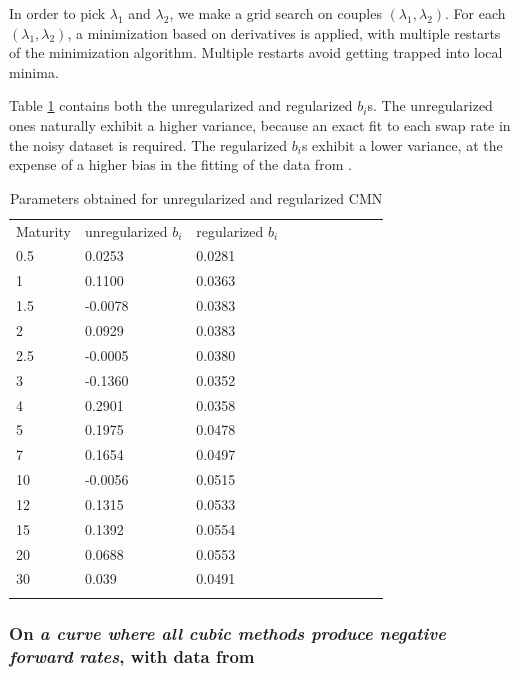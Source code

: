 In order to pick $\lambda_1$ and $\lambda_2$, we make a grid search on couples $(\lambda_1, \lambda_2)$. For each $(\lambda_1, \lambda_2)$, a minimization based on derivatives is applied, with multiple restarts of the minimization algorithm. Multiple restarts avoid getting trapped into local minima.

\medskip

Table \ref{tab:andersen2007tables1} contains both the unregularized and regularized $b_i$s. The unregularized ones naturally exhibit a higher variance, because an exact fit to each swap rate in the noisy dataset is required. The regularized $b_i$s exhibit a lower variance, at the expense of a higher bias in the fitting of the data from \cite{andersen2007discount}.

\begin{table}
\begin{center}
\caption{Parameters obtained for unregularized and regularized CMN}
\label{tab:andersen2007tables1}       %
\begin{tabular}{llllllllll}
\hline\noalign{\smallskip}
Maturity & unregularized $b_i$ & regularized $b_i$  \\
\noalign{\smallskip}\hline\noalign{\smallskip}
  0.5 & 0.0253  & 0.0281\\
  1 & 0.1100  & 0.0363\\
  1.5 & -0.0078  & 0.0383\\
  2 & 0.0929  & 0.0383\\
  2.5 & -0.0005  & 0.0380\\
  3 & -0.1360  & 0.0352\\
  4 & 0.2901  & 0.0358\\
  5 & 0.1975  & 0.0478\\
  7 & 0.1654  & 0.0497\\
  10 & -0.0056 & 0.0515\\
  12 & 0.1315 & 0.0533\\
  15 & 0.1392 & 0.0554\\
  20 & 0.0688 & 0.0553\\
  30 & 0.039 & 0.0491\\
\noalign{\smallskip}\hline
\end{tabular}
\end{center}
\end{table}

\subsubsection{On \textit{a curve where all cubic methods produce negative forward rates}, with data from \cite{hagan2006interpolation}}
\label{curvehagan}

